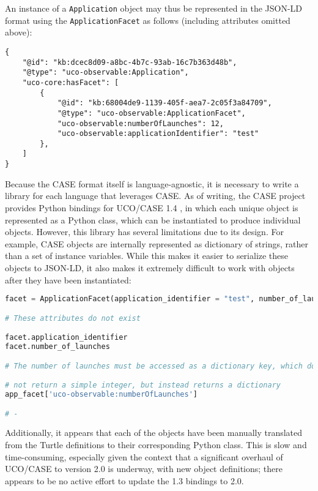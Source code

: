 \documentclass[letterpaper,12pt]{report}
\newcommand{\passthrough}[1]{#1}
\begin{document}
An instance of a \passthrough{\lstinline!Application!} object may thus
be represented in the JSON-LD format using the
\passthrough{\lstinline!ApplicationFacet!} as follows (including
attributes omitted above):

\begin{lstlisting}
{
    "@id": "kb:dcec8d09-a8bc-4b7c-93ab-16c7b363d48b",
    "@type": "uco-observable:Application",
    "uco-core:hasFacet": [
        {
            "@id": "kb:68004de9-1139-405f-aea7-2c05f3a84709",
            "@type": "uco-observable:ApplicationFacet",
            "uco-observable:numberOfLaunches": 12,
            "uco-observable:applicationIdentifier": "test"
        },
    ]
}
\end{lstlisting}

Because the CASE format itself is language-agnostic, it is necessary to
write a library for each language that leverages CASE. As of writing,
the CASE project provides Python bindings for UCO/CASE 1.4
\cite{CaseworkCASEMappingPython}, in which each unique object is
represented as a Python class, which can be instantiated to produce
individual objects. However, this library has several limitations due to
its design. For example, CASE objects are internally represented as
dictionary of strings, rather than a set of instance variables. While
this makes it easier to serialize these objects to JSON-LD, it also
makes it extremely difficult to work with objects after they have been
instantiated:

\begin{lstlisting}[language=Python]
facet = ApplicationFacet(application_identifier = "test", number_of_launches=3)

# These attributes do not exist

facet.application_identifier
facet.number_of_launches

# The number of launches must be accessed as a dictionary key, which does

# not return a simple integer, but instead returns a dictionary
app_facet['uco-observable:numberOfLaunches']

# -
\end{lstlisting}

Additionally, it appears that each of the objects have been manually
translated from the Turtle definitions to their corresponding Python
class. This is slow and time-consuming, especially given the context
that a significant overhaul of UCO/CASE to version 2.0 is underway, with
new object definitions; there appears to be no active effort to update
the 1.3 bindings to 2.0.
\end{document}
